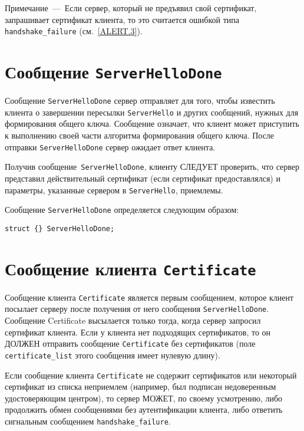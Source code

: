 \begin{note}
Примечание~---~Если сервер, который не предъявил свой сертификат, 
запрашивает сертификат клиента, то это считается ошибкой типа  
\lstinline{handshake_failure} (см.~\ref{ALERT.3}).
\end{note}  

\section{Сообщение \lstinline{ServerHelloDone}}\label{HANDSHAKE.11}

Сообщение \lstinline{ServerHelloDone} сервер отправляет для того, чтобы
известить клиента о завершении пересылки \lstinline{ServerHello} и других
сообщений, нужных для формирования общего ключа. Сообщение означает, что
клиент может приступить к выполнению своей части алгоритма формирования
общего ключа. После отправки \lstinline{ServerHelloDone} сервер ожидает
ответ клиента.

Получив сообщение~\lstinline{ServerHelloDone}, клиенту СЛЕДУЕТ проверить,
что сервер представил действительный сертификат (если сертификат
предоставлялся) и параметры, указанные сервером в \lstinline{ServerHello},
приемлемы.

Сообщение \lstinline{ServerHelloDone} определяется следующим образом:
\begin{lstlisting}
struct {} ServerHelloDone;
\end{lstlisting}

\section{Сообщение клиента \lstinline{Certificate}}\label{HANDSHAKE.12}

Сообщение клиента \lstinline{Certificate} является первым сообщением,
которое клиент посылает серверу после получения от него сообщения
\lstinline{ServerHelloDone}. Сообщение Certificate высылается только тогда,
когда сервер запросил сертификат клиента. Если у клиента нет подходящих
сертификатов, то он ДОЛЖЕН отправить сообщение \lstinline{Certificate} без
сертификатов (поле \lstinline{certificate_list} этого сообщения имеет
нулевую длину).

Если сообщение клиента \lstinline{Certificate} не содержит сертификатов или
некоторый сертификат из списка неприемлем (например, был подписан
недоверенным удостоверяющим центром), то сервер МОЖЕТ, по своему
усмотрению, либо продолжить обмен сообщениями без аутентификации клиента,
либо ответить сигнальным сообщением \lstinline{handshake_failure}.

